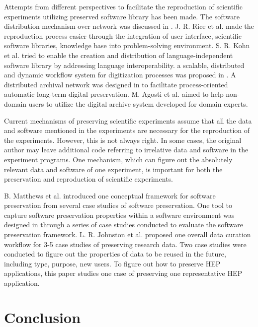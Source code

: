 \documentclass{sig-alternate}
\begin{document}
Attempts from different perspectives to facilitate the reproduction of scientific experiments utilizing preserved software library has been made. 
The software distribution mechanism over network was discussed in \cite{compostella2010cdf, blomer2011cernvm}.
J. R. Rice et al. \cite{rice1996scientific} made the reproduction process easier through the integration of user interface, scientific software libraries, knowledge base into problem-solving environment.
S. R. Kohn et al. \cite{kohn2001divorcing} tried to enable the creation and distribution of language-independent software library by addressing language interoperability.
a scalable, distributed and dynamic workflow system for digitization processes was proposed in \cite{schoneberg2013scalable}.
A distributed archival network was designed in \cite{subotic2013distributed} to facilitate process-oriented automatic long-term digital preservation.
M. Agosti et al. \cite{agosti2012envisage} aimed to help non-domain users to utilize the digital archive system developed for domain experts.

Current mechanisms of preserving scientific experiments assume that all the data and software mentioned in the experiments are necessary for the reproduction of the experiments. However, this is not always right. In some cases, the original author may leave additional code referring to irrelative data and software in the experiment programs. One mechanism, which can figure out the absolutely relevant data and software of one experiment, is important for both the preservation and reproduction of scientific experiments.

B. Matthews et al. \cite{matthews2008significant} introduced one conceptual framework for software preservation from several case studies of software preservation.
One tool to capture software preservation properties within a software environment was designed in \cite{matthews2010framework} through a series of case studies conducted to evaluate the software preservation framework.
L. R. Johnston et al. \cite{johnston2014workflow} proposed one overall data curation workflow for 3-5 case studies of preserving research data.
Two case studies \cite{borgman2012data} were conducted to figure out the properties of data to be reused in the future, including type, purpose, new users.
To figure out how to preserve HEP applications, this paper studies one case of preserving one representative HEP application.


\section{Conclusion}
\end{document}

